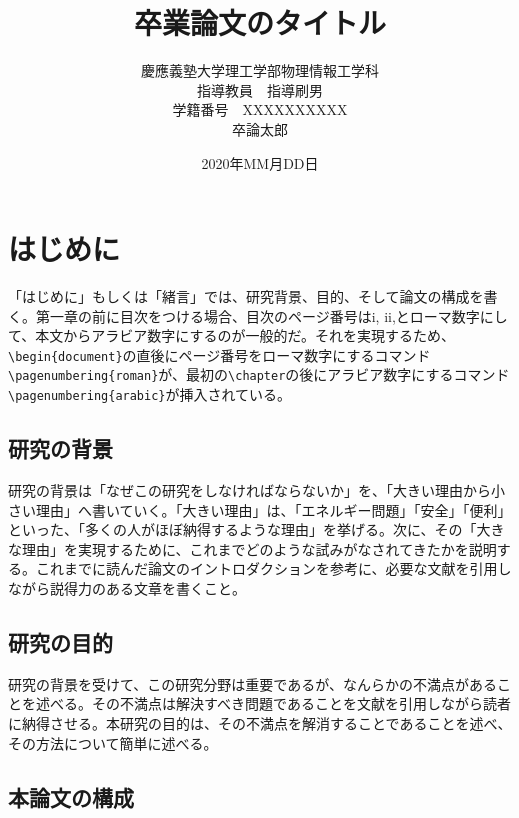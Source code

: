 \documentclass[titlepage]{jsreport}
\title{卒業論文のタイトル}
\author{慶應義塾大学理工学部物理情報工学科\\
指導教員　指導刷男\\
学籍番号　XXXXXXXXXX\\
卒論太郎}
\date{2020年MM月DD日}
\begin{document}
\maketitle

\tableofcontents

\chapter{はじめに} \label{chap:introduction}

「はじめに」もしくは「緒言」では、研究背景、目的、そして論文の構成を書く。第一章の前に目次をつける場合、目次のページ番号はi, ii,とローマ数字にして、本文からアラビア数字にするのが一般的だ。それを実現するため、\verb|\begin{document}|の直後にページ番号をローマ数字にするコマンド\verb|\pagenumbering{roman}|が、最初の\verb|\chapter|の後にアラビア数字にするコマンド\verb|\pagenumbering{arabic}|が挿入されている。

\section{研究の背景}

研究の背景は「なぜこの研究をしなければならないか」を、「大きい理由から小さい理由」へ書いていく。「大きい理由」は、「エネルギー問題」「安全」「便利」といった、「多くの人がほぼ納得するような理由」を挙げる。次に、その「大きな理由」を実現するために、これまでどのような試みがなされてきたかを説明する。これまでに読んだ論文のイントロダクションを参考に、必要な文献を引用しながら説得力のある文章を書くこと。

\section{研究の目的}

研究の背景を受けて、この研究分野は重要であるが、なんらかの不満点があることを述べる。その不満点は解決すべき問題であることを文献を引用しながら読者に納得させる。本研究の目的は、その不満点を解消することであることを述べ、その方法について簡単に述べる。

\section{本論文の構成}
\end{document}
